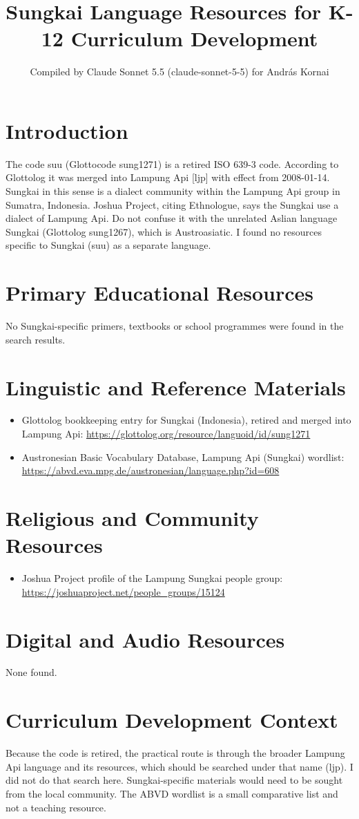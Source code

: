 \documentclass[12pt]{article}
\title{Sungkai Language Resources for K-12 Curriculum Development}
\author{Compiled by Claude Sonnet 5.5 (claude-sonnet-5-5) for Andr\'as Kornai}
\date{}
\begin{document}
\maketitle

\section{Introduction}
The code suu (Glottocode sung1271) is a retired ISO 639-3 code. According to Glottolog it was merged into Lampung Api [ljp] with effect from 2008-01-14. Sungkai in this sense is a dialect community within the Lampung Api group in Sumatra, Indonesia. Joshua Project, citing Ethnologue, says the Sungkai use a dialect of Lampung Api. Do not confuse it with the unrelated Aslian language Sungkai (Glottolog sung1267), which is Austroasiatic. I found no resources specific to Sungkai (suu) as a separate language.

\section{Primary Educational Resources}
No Sungkai-specific primers, textbooks or school programmes were found in the search results.

\section{Linguistic and Reference Materials}
\begin{itemize}
\item Glottolog bookkeeping entry for Sungkai (Indonesia), retired and merged into Lampung Api: \url{https://glottolog.org/resource/languoid/id/sung1271}
\item Austronesian Basic Vocabulary Database, Lampung Api (Sungkai) wordlist: \url{https://abvd.eva.mpg.de/austronesian/language.php?id=608}
\end{itemize}

\section{Religious and Community Resources}
\begin{itemize}
\item Joshua Project profile of the Lampung Sungkai people group: \url{https://joshuaproject.net/people_groups/15124}
\end{itemize}

\section{Digital and Audio Resources}
None found.

\section{Curriculum Development Context}
Because the code is retired, the practical route is through the broader Lampung Api language and its resources, which should be searched under that name (ljp). I did not do that search here. Sungkai-specific materials would need to be sought from the local community. The ABVD wordlist is a small comparative list and not a teaching resource.
\end{document}
